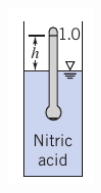 \documentclass[11pt]{report}
\begin{document}
\begin{figure}[H]
\centering\includegraphics[width=0.2\textwidth]{p6.png}
\caption{\label{fig:fig6} }
\end{figure}

\end{document}
